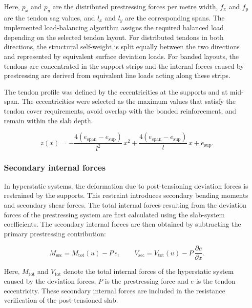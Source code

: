 Here, \(p_x\) and \(p_y\) are the distributed prestressing forces per metre width, \(f_x\) and \(f_y\) are the tendon sag values, and \(l_x\) and \(l_y\) are the corresponding spans. The implemented load-balancing algorithm assigns the required balanced load depending on the selected tendon layout. For distributed tendons in both directions, the structural self-weight is split equally between the two directions and represented by equivalent surface deviation loads. For banded layouts, the tendons are concentrated in the support strips and the internal forces caused by prestressing are derived from equivalent line loads acting along these strips. 

The tendon profile was defined by the eccentricities at the supports and at mid-span. The eccentricities were selected as the maximum values that satisfy the tendon cover requirements, avoid overlap with the bonded reinforcement, and remain within the slab depth.

\begin{equation}
z(x)
=
-\frac{4(e_{\mathrm{span}}-e_{\mathrm{sup}})}{l^2}\,x^2
+
\frac{4(e_{\mathrm{span}}-e_{\mathrm{sup}})}{l}\,x
+
e_{\mathrm{sup}}.
\end{equation}


\subsubsection{Secondary internal forces}

In hyperstatic systems, the deformation due to post-tensioning deviation forces is restrained by the supports. This restraint introduces secondary bending moments and secondary shear forces. The total internal forces resulting from the deviation forces of the prestressing system are first calculated using the slab-system coefficients. The secondary internal forces are then obtained by subtracting the primary prestressing contribution:

\begin{equation}
M_{\mathrm{sec}}
=
M_{\mathrm{tot}}(u)
-
P\,e,
\qquad
V_{\mathrm{sec}}
=
V_{\mathrm{tot}}(u)
-
P\,\frac{\partial e}{\partial x}.
\end{equation}

Here, \(M_{\mathrm{tot}}\) and \(V_{\mathrm{tot}}\) denote the total internal forces of the hyperstatic system caused by the deviation forces, \(P\) is the prestressing force and \(e\) is the tendon eccentricity. These secondary internal forces are included in the resistance verification of the post-tensioned slab.

